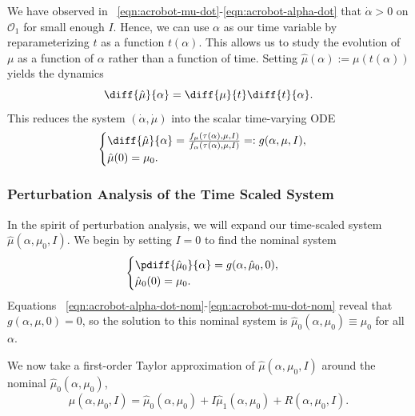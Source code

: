 We have observed in ~\eqref{eqn:acrobot-mu-dot}-\eqref{eqn:acrobot-alpha-dot}
that \(\dot{\alpha} > 0\) on \(\mathcal{O}_1\) for small enough \(I\). 
Hence, we can use \(\alpha\) as our time variable by reparameterizing \(t\) as a
function \(t(\alpha)\).
This allows us to study the evolution of \(\mu\) as a function of \(\alpha\)
rather than a function of time.
Setting \(\hat{\mu}(\alpha) := \mu(t(\alpha))\) yields the dynamics
\[
    \diff{\hat{\mu}}{\alpha} = 
    \diff{\mu}{t} \diff{t}{\alpha}
    .
\] 
This reduces the system \((\dot{\alpha},\dot{\mu})\) into the scalar
time-varying ODE 
\begin{equation}\label{eqn:muhat-dot}
    \begin{cases}
        \diff{\hat{\mu}}{\alpha} 
        = \frac{f_\mu(\tau(\alpha),\mu,I)}{f_\alpha(\tau(\alpha),\mu,I)}
        =: g(\alpha,\mu,I)
        , \\
        \hat{\mu}(0) = \mu_0
        .
    \end{cases}
\end{equation}

\subsubsection*{Perturbation Analysis of the Time Scaled System}

In the spirit of perturbation analysis, we will expand our time-scaled system
\(\hat{\mu}(\alpha,\mu_0,I)\).
We begin by setting \(I = 0\) to find the nominal system
\[
\begin{cases}
    \pdiff{\hat{\mu}_0}{\alpha} = g(\alpha,\hat{\mu}_0,0)
    , \\
    \hat{\mu}_0(0) = \mu_0
   .
\end{cases}
\]
Equations ~\eqref{eqn:acrobot-alpha-dot-nom}-\eqref{eqn:acrobot-mu-dot-nom}
reveal that \(g(\alpha,\mu,0) = 0\),
so the solution to this nominal system is 
\(\hat{\mu}_0(\alpha,\mu_0) \equiv \mu_0\) for all \(\alpha\).

We now take a first-order Taylor approximation of \(\hat{\mu}(\alpha,\mu_0,I)\)
around the nominal \(\hat{\mu}_0(\alpha,\mu_0)\),
\begin{equation}\label{eqn:acrobot-muhat-approx}
    \hat{\mu}(\alpha,\mu_0,I) = \hat{\mu}_0(\alpha,\mu_0) + I
    \hat{\mu}_1(\alpha,\mu_0)
    + R(\alpha,\mu_0,I)
    .
\end{equation}

